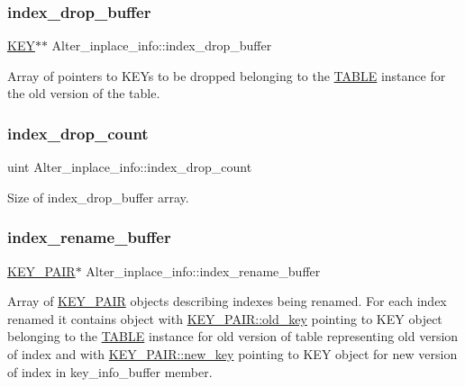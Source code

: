 \subsubsection{\texorpdfstring{index\+\_\+drop\+\_\+buffer}{index\_drop\_buffer}}
{\footnotesize\ttfamily \mbox{\hyperlink{structst__key}{K\+EY}}$\ast$$\ast$ Alter\+\_\+inplace\+\_\+info\+::index\+\_\+drop\+\_\+buffer}

Array of pointers to K\+E\+Ys to be dropped belonging to the \mbox{\hyperlink{structTABLE}{T\+A\+B\+LE}} instance for the old version of the table. \mbox{\label{classAlter__inplace__info_a41e2dc4598fb84412237f845b501d086}} 
\subsubsection{\texorpdfstring{index\+\_\+drop\+\_\+count}{index\_drop\_count}}
{\footnotesize\ttfamily uint Alter\+\_\+inplace\+\_\+info\+::index\+\_\+drop\+\_\+count}

Size of index\+\_\+drop\+\_\+buffer array. \mbox{\label{classAlter__inplace__info_a647f50b8e6b500412aa5aa4f6b1e676b}} 
\subsubsection{\texorpdfstring{index\+\_\+rename\+\_\+buffer}{index\_rename\_buffer}}
{\footnotesize\ttfamily \mbox{\hyperlink{structKEY__PAIR}{K\+E\+Y\+\_\+\+P\+A\+IR}}$\ast$ Alter\+\_\+inplace\+\_\+info\+::index\+\_\+rename\+\_\+buffer}

Array of \mbox{\hyperlink{structKEY__PAIR}{K\+E\+Y\+\_\+\+P\+A\+IR}} objects describing indexes being renamed. For each index renamed it contains object with \mbox{\hyperlink{structKEY__PAIR_a877ecf9a313678a20cb24c1dde207245}{K\+E\+Y\+\_\+\+P\+A\+I\+R\+::old\+\_\+key}} pointing to K\+EY object belonging to the \mbox{\hyperlink{structTABLE}{T\+A\+B\+LE}} instance for old version of table representing old version of index and with \mbox{\hyperlink{structKEY__PAIR_a25f827d0b994f28eeed47376cea439b6}{K\+E\+Y\+\_\+\+P\+A\+I\+R\+::new\+\_\+key}} pointing to K\+EY object for new version of index in key\+\_\+info\+\_\+buffer member. \mbox{\label{classAlter__inplace__info_a9344a798cee362d987c0198d6a36a1fa}} 
